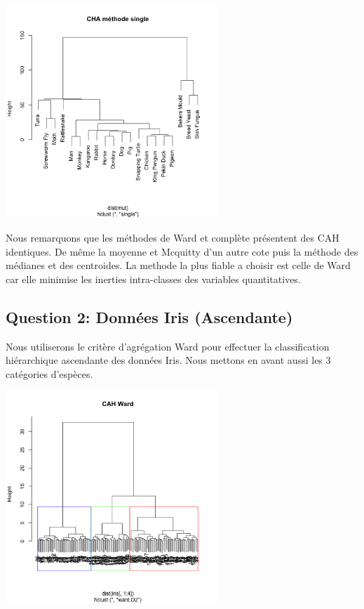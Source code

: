\documentclass[10pt]{article}
\begin{document}
	\begin{center}
		\includegraphics[height = 8cm, width = 8cm]{Figures/HClust/hclust_Mutations_sgl.png}
	\end{center}
	
	Nous remarquons que les méthodes de Ward et complète présentent des CAH identiques. De même la moyenne et Mcquitty d'un autre cote puis la méthode des médianes et des centroides.
	La methode la plus fiable a choisir est celle de Ward car elle minimise les inerties intra-classes des variables quantitatives.

	\subsection{Question 2:  Données Iris (Ascendante)}
	
	Nous utiliserons le critère d'agrégation Ward pour effectuer la classification hiérarchique ascendante des données Iris. Nous mettons en avant aussi les 3 catégories d'espèces.
	\begin{center}
		\includegraphics[height = 8cm, width = 8cm]{Figures/HClust/hclust_Iris_ward.png}
	\end{center}
\end{document}
